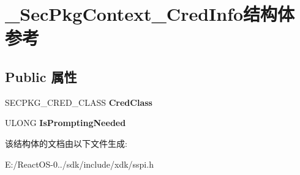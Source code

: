 \hypertarget{struct___sec_pkg_context___cred_info}{}\section{\+\_\+\+Sec\+Pkg\+Context\+\_\+\+Cred\+Info结构体 参考}
\label{struct___sec_pkg_context___cred_info}
\subsection*{Public 属性}
\begin{DoxyCompactItemize}
\item 
\mbox{\label{struct___sec_pkg_context___cred_info_a6e0109b850a83399d1b6bebce0f7109b}} 
S\+E\+C\+P\+K\+G\+\_\+\+C\+R\+E\+D\+\_\+\+C\+L\+A\+SS {\bfseries Cred\+Class}
\item 
\mbox{\label{struct___sec_pkg_context___cred_info_ae005dc43c3e1b75dbceb25d22bda29a7}} 
U\+L\+O\+NG {\bfseries Is\+Prompting\+Needed}
\end{DoxyCompactItemize}


该结构体的文档由以下文件生成\+:\begin{DoxyCompactItemize}
\item 
E\+:/\+React\+O\+S-\/0../sdk/include/xdk/sspi.\+h\end{DoxyCompactItemize}
